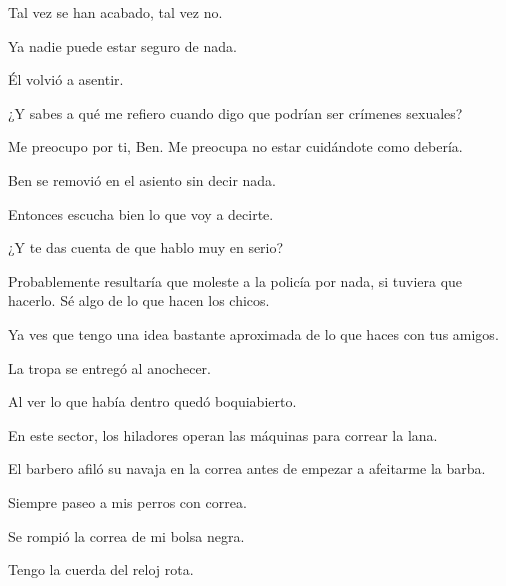 \sk
Tal vez se han acabado,
tal vez no. 

\sk
Ya nadie puede estar seguro de nada. 

\sk
Él volvió a asentir. 

\sk
¿Y sabes a qué me refiero cuando digo que
podrían ser crímenes sexuales?

\sk
Me preocupo por ti, Ben. Me preocupa no
estar cuidándote como debería.

\sk
Ben se removió en el asiento sin decir nada.

\sk
Entonces escucha bien lo que voy a
decirte. 

\sk
¿Y te das cuenta de que hablo muy en serio?

\sk
Probablemente resultaría que moleste a la
policía por nada, si tuviera que hacerlo. Sé algo de
lo que hacen los chicos. 

\sk
Ya ves que tengo una idea
bastante aproximada de lo que haces con tus
amigos.

\sk
La tropa se entregó al anochecer. 

\sk
Al ver lo que había dentro quedó
boquiabierto.

\sk
En este sector, los hiladores operan las máquinas para correar la lana. 

\sk
El barbero afiló su navaja en la correa antes de empezar a afeitarme la barba. 

\sk
Siempre paseo a mis perros con correa. 

\sk
Se rompió la correa de mi bolsa negra. 

\sk
Tengo la cuerda del reloj rota. 

